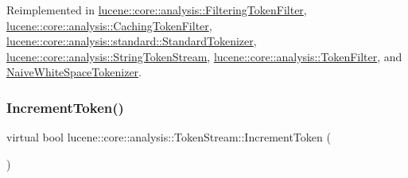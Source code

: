 Reimplemented in \mbox{\hyperlink{classlucene_1_1core_1_1analysis_1_1FilteringTokenFilter_adf6b7aac9634afdffe1800a369753688}{lucene\+::core\+::analysis\+::\+Filtering\+Token\+Filter}}, \mbox{\hyperlink{classlucene_1_1core_1_1analysis_1_1CachingTokenFilter_a7241be5e51e730f4e311572510de147e}{lucene\+::core\+::analysis\+::\+Caching\+Token\+Filter}}, \mbox{\hyperlink{classlucene_1_1core_1_1analysis_1_1standard_1_1StandardTokenizer_a733b678af865ff10e41fba9b74131872}{lucene\+::core\+::analysis\+::standard\+::\+Standard\+Tokenizer}}, \mbox{\hyperlink{classlucene_1_1core_1_1analysis_1_1StringTokenStream_aabf9a873c934aff5c359417488f33849}{lucene\+::core\+::analysis\+::\+String\+Token\+Stream}}, \mbox{\hyperlink{classlucene_1_1core_1_1analysis_1_1TokenFilter_ad2e29dd32aa4df385d0f290f10f20721}{lucene\+::core\+::analysis\+::\+Token\+Filter}}, and \mbox{\hyperlink{classNaiveWhiteSpaceTokenizer_a4c4f4debc08aa3e05b07b782144b5ae6}{Naive\+White\+Space\+Tokenizer}}.

\mbox{\label{classlucene_1_1core_1_1analysis_1_1TokenStream_a614d4ea24a354d6f4354b4941b5124e2}} 
\subsubsection{\texorpdfstring{Increment\+Token()}{IncrementToken()}}
{\footnotesize\ttfamily virtual bool lucene\+::core\+::analysis\+::\+Token\+Stream\+::\+Increment\+Token (\begin{DoxyParamCaption}{ }\end{DoxyParamCaption})\hspace{0.3cm}{\ttfamily [pure virtual]}}



